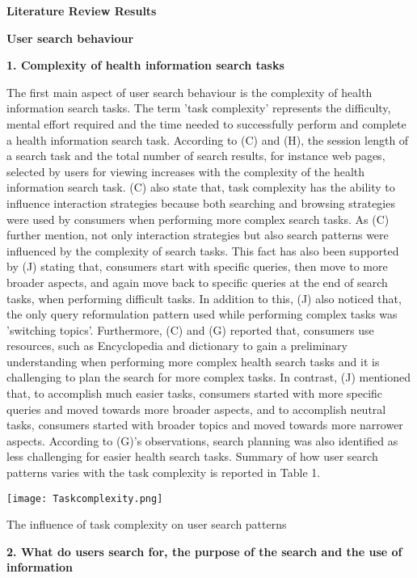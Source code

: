 \documentclass[]{article}
\begin{document}
\textbf{Literature Review Results}

\textbf{User search behaviour}


\textbf{1. Complexity of health information search tasks} 

The first main aspect of user search behaviour is the complexity of health information search tasks. The term 'task complexity' represents the difficulty, mental effort required and the time needed to successfully perform and complete a health information search task. According to (C) and (H), the session length of a search task and the total number of search results, for instance web pages, selected by users for viewing increases with the complexity of the health information search task. (C) also state that, task complexity has the ability to influence interaction strategies because both searching and browsing strategies were used by consumers when performing more complex search tasks. As (C) further mention, not only interaction strategies but also search patterns were influenced by the complexity of search tasks. This fact has also been supported by (J) stating that,  consumers start with specific queries, then move to more broader aspects, and again move back to specific queries at the end of search tasks, when performing difficult tasks. In addition to this, (J) also noticed that, the only query reformulation pattern used while performing complex tasks was 'switching topics'. Furthermore, (C) and (G) reported that, consumers use resources, such as Encyclopedia and dictionary to gain a preliminary understanding when performing more complex health search tasks and it is challenging to plan the search for more complex tasks. In contrast, (J) mentioned that, to accomplish much easier tasks, consumers started with more specific queries and moved towards more broader aspects, and to accomplish neutral tasks, consumers started with broader topics and moved towards more narrower aspects. According to (G)'s observations, search planning was also identified as less challenging for easier health search tasks. Summary of how user search patterns varies with the task complexity is reported in Table 1. 

\begin{table}[t!]
	\texttt{[image: Taskcomplexity.png]}
	\caption{The influence of task complexity on user search patterns\label{tabel1}}
\end{table} 


\textbf{2. What do users search for, the purpose of the search and the use of information}
\end{document}

